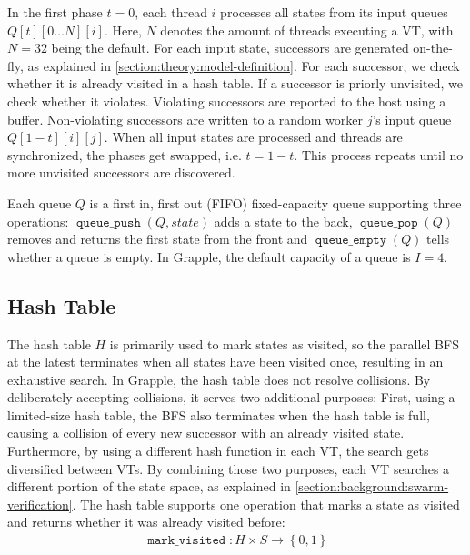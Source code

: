 \documentclass[
fancyheadings, %
%
%
]{stsreprt}
\DeclareMathOperator{\markVisited}{\texttt{mark\_visited}}
\DeclareMathOperator{\qEmpty}{\texttt{queue\_empty}}
\DeclareMathOperator{\qPop}{\texttt{queue\_pop}}
\DeclareMathOperator{\qPush}{\texttt{queue\_push}}
\begin{document}
In the first phase $t=0$, each thread $i$ processes all states from its input queues $Q\left[t\right]\left[ 0 \dots N \right]\left[i\right]$.
Here, $N$ denotes the amount of threads executing a VT, with $N=32$ being the default.
For each input state, successors are generated on-the-fly, as explained in \cref{section:theory:model-definition}.
For each successor, we check whether it is already visited in a hash table.
If a successor is priorly unvisited, we check whether it violates.
Violating successors are reported to the host using a buffer.
Non-violating successors are written to a random worker $j$'s input queue $Q\left[1 - t\right]\left[i\right]\left[j\right]$.
When all input states are processed and threads are synchronized, the phases get swapped, i.e. $t = 1 - t$.
This process repeats until no more unvisited successors are discovered.


Each queue $Q$ is a first in, first out (FIFO) fixed-capacity queue supporting three operations: $\qPush(Q, state)$ adds a state to the back, $\qPop(Q)$ removes and returns the first state from the front and $\qEmpty(Q)$ tells whether a queue is empty.
In Grapple, the default capacity of a queue is $I=4$.

\subsection{Hash Table}
\label{section:theory:hash-table}

The hash table $H$ is primarily used to mark states as visited, so the parallel BFS at the latest terminates when all states have been visited once, resulting in an exhaustive search.
In Grapple, the hash table does not resolve collisions.
By deliberately accepting collisions, it serves two additional purposes:
First, using a limited-size hash table, the BFS also terminates when the hash table is full, causing a collision of every new successor with an already visited state.
Furthermore, by using a different hash function in each VT, the search gets diversified between VTs.
By combining those two purposes, each VT searches a different portion of the state space, as explained in \cref{section:background:swarm-verification}.
The hash table supports one operation that marks a state as visited and returns whether it was already visited before:
\begin{align*}
    \markVisited : H \times S \to \left\{0, 1\right\}
\end{align*}
\end{document}
